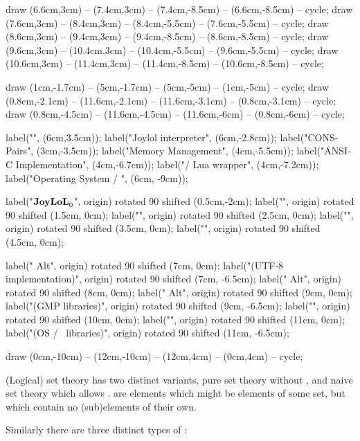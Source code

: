 draw (6.6cm,3cm) -- (7.4cm,3cm) -- (7.4cm,-8.5cm) -- (6.6cm,-8.5cm) -- cycle;
draw (7.6cm,3cm) -- (8.4cm,3cm) -- (8.4cm,-5.5cm) -- (7.6cm,-5.5cm) -- cycle;
draw (8.6cm,3cm) -- (9.4cm,3cm) -- (9.4cm,-8.5cm) -- (8.6cm,-8.5cm) -- cycle;
draw (9.6cm,3cm) -- (10.4cm,3cm) -- (10.4cm,-5.5cm) -- (9.6cm,-5.5cm) -- cycle;
draw (10.6cm,3cm) -- (11.4cm,3cm) -- (11.4cm,-8.5cm) -- (10.6cm,-8.5cm) -- cycle;

draw (1cm,-1.7cm)   -- (5cm,-1.7cm)    -- (5cm,-5cm)      -- (1cm,-5cm)     -- cycle;
draw (0.8cm,-2.1cm) -- (11.6cm,-2.1cm) -- (11.6cm,-3.1cm) -- (0.8cm,-3.1cm) -- cycle;
draw (0.8cm,-4.5cm) -- (11.6cm,-4.5cm) -- (11.6cm,-6cm)   -- (0.8cm,-6cm)   -- cycle;


label("", (6cm,3.5cm));
label("Joylol interpreter", (6cm,-2.8cm));
label("CONS-Pairs", (3cm,-3.5cm));
label("Memory Management", (4cm,-5.5cm));
label("ANSI-C Implementation", (4cm,-6.7cm));
label("/ Lua wrapper", (4cm,-7.2cm));
label("Operating System / \LuaTeX", (6cm, -9cm));

label("$\bold{JoyLoL}_0$", origin) rotated 90 shifted (0.5cm,-2cm);
label("", origin) rotated 90 shifted (1.5cm, 0cm);
label("", origin) rotated 90 shifted (2.5cm, 0cm);
label("", origin) rotated 90 shifted (3.5cm, 0cm);
label("", origin) rotated 90 shifted (4.5cm, 0cm);

label(" Alt", origin) rotated 90 shifted (7cm, 0cm);
label("(UTF-8 implementation)", origin) rotated 90 shifted (7cm, -6.5cm);
label(" Alt", origin) rotated 90 shifted (8cm, 0cm);
label(" Alt", origin) rotated 90 shifted (9cm, 0cm);
label("(GMP libraries)", origin) rotated 90 shifted (9cm, -6.5cm);
label("", origin) rotated 90 shifted (10cm, 0cm);
label("", origin) rotated 90 shifted (11cm, 0cm);
label("(OS / \LuaTeX\ libraries)", origin) rotated 90 shifted (11cm, -6.5cm);

draw (0cm,-10cm) -- (12cm,-10cm) -- (12cm,4cm) -- (0cm,4cm) -- cycle;

\stopMPcode\egroup

(Logical) set theory has two distinct variants, pure set theory without 
, and naive set theory which allows 
.  are  elements which 
might be elements of some set, but which contain no (sub)elements of their 
own. 

Similarly there are three distinct types of \joylol: 

